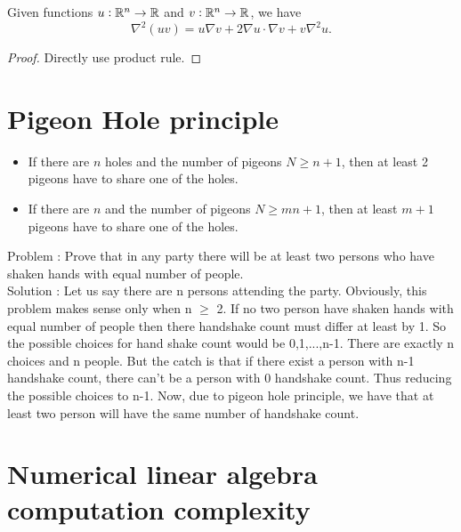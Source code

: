 \begin{refsection}
\begin{lemma}
Given functions $u: \mathbb{R}^n\to \mathbb{R}$ and $v:\mathbb{R}^n \to \mathbb{R}$, we have 
	$$\nabla^2 (uv) = u\nabla v + 2\nabla u \cdot \nabla v + v\nabla^2 u.$$
\end{lemma}
\begin{proof}
Directly use product rule. 
\end{proof}



\section{Pigeon Hole principle}
\begin{lemma}\hfill
\begin{itemize}
	\item If there are $n$ holes and the number of pigeons $N \geq n+1$, then at least 2 pigeons have to share one of the holes.
	\item If there are $n$ and the number of pigeons $N \geq mn+1$, then at least $m+1$ pigeons have to share one of the holes.
\end{itemize}
\end{lemma}



\begin{example}
Problem : Prove that in any party there will be at least two persons who have shaken hands with equal number of people.\\

Solution : Let us say there are n persons attending the party. Obviously, this problem makes sense only when n $\geq$ 2. If no two person have shaken hands with equal number of people then there handshake count must differ at least by 1. So the possible choices for hand shake count would be 0,1,...,n-1. There are exactly n choices and n people. But the catch is that if there exist a person with n-1 handshake count, there can't be a person with 0 handshake count. Thus reducing the possible choices to n-1. Now, due to pigeon hole principle, we have that at least two person will have the same number of handshake count.
\end{example}

\section{Numerical linear algebra computation complexity}


\end{refsection}

